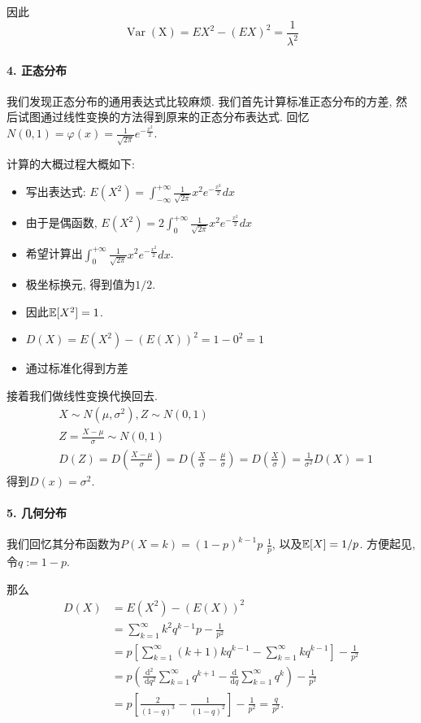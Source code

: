 因此
$$
\operatorname{Var}(\mathrm{X})=E X^2-(E X)^2=\frac{1}{\lambda^2}
$$

\paragraph{4. 正态分布} 我们发现正态分布的通用表达式比较麻烦. 我们首先计算标准正态分布的方差, 然后试图通过线性变换的方法得到原来的正态分布表达式. 回忆$N(0,1)=\varphi(x)=\frac{1}{\sqrt{2 \pi}} e^{-\frac{x^2}{2}}$. 

计算的大概过程大概如下: 
\begin{itemize}
    \item 写出表达式: $E\left(X^2\right)=\int_{-\infty}^{+\infty} \frac{1}{\sqrt{2 \pi}} x^2 e^{-\frac{x^2}{2}} d x$
    \item 由于是偶函数, $E\left(X^2\right)=2 \int_0^{+\infty} \frac{1}{\sqrt{2 \pi}} x^2 e^{-\frac{x^2}{2}} d x$
    \item 希望计算出$\int_0^{+\infty} \frac{1}{\sqrt{2 \pi}} x^2 e^{-\frac{x^2}{2}} d x$.
    \item 极坐标换元, 得到值为$1/2$.
    \item 因此$\mathbb E[X^2]=1$.
    \item $D(X)=E\left(X^2\right)-(E(X))^2=1-0^2=1$
    \item 通过标准化得到方差
\end{itemize}

接着我们做线性变换代换回去. 
$$
\begin{aligned}
& X \sim N\left(\mu, \sigma^2\right), Z \sim N(0,1) \\
& Z=\frac{X-\mu}{\sigma} \sim N(0,1) \\
& D(Z)=D\left(\frac{X-\mu}{\sigma}\right)=D\left(\frac{X}{\sigma}-\frac{\mu}{\sigma}\right)=D\left(\frac{X}{\sigma}\right)=\frac{1}{\sigma^2} D(X)=1
\end{aligned}
$$
得到$D(x)=\sigma^2$.

\paragraph{5. 几何分布 } 我们回忆其分布函数为$P(X=k)=(1-p)^{k-1} p$ $\frac{1}{p}$, 以及$\mathbb E[X]=1/p$. 方便起见, 令$q:=1-p$. 

那么
$$\begin{aligned} D(X) & =E\left(X^2\right)-(E(X))^2 \\ & =\sum_{k=1}^{\infty} k^2 q^{k-1} p-\frac{1}{p^2} \\ & =p\left[\sum_{k=1}^{\infty}(k+1) k q^{k-1}-\sum_{k=1}^{\infty} k q^{k-1}\right]-\frac{1}{p^2} \\ & =p\left(\frac{\mathrm{d}^2}{\mathrm{~d} q^2} \sum_{k=1}^{\infty} q^{k+1}-\frac{\mathrm{d}}{\mathrm{d} q} \sum_{k=1}^{\infty} q^k\right)-\frac{1}{p^2} \\ & =p\left[\frac{2}{(1-q)^3}-\frac{1}{(1-q)^2}\right]-\frac{1}{p^2}=\frac{q}{p^2} .\end{aligned}$$

